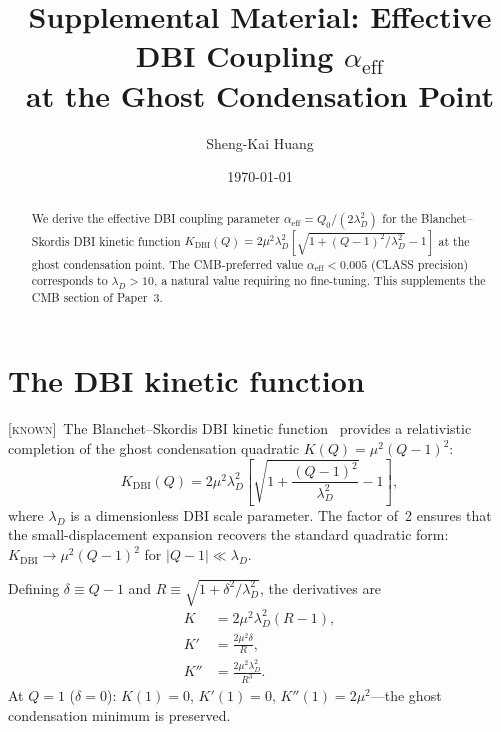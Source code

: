 \documentclass[prd,twocolumn,superscriptaddress,longbibliography,floatfix]{revtex4-2}
\newcommand{\known}{\textsc{[known]}}
\begin{document}
\title{Supplemental Material: Effective DBI Coupling $\alpha_{\mathrm{eff}}$\\
at the Ghost Condensation Point}

\author{Sheng-Kai Huang}

\date{\today}

\begin{abstract}
We derive the effective DBI coupling parameter
$\alpha_{\mathrm{eff}} = Q_0/(2\lambda_D^2)$ for the
Blanchet--Skordis DBI kinetic function
$K_{\mathrm{DBI}}(Q) = 2\mu^2\lambda_D^2
[\sqrt{1 + (Q{-}1)^2/\lambda_D^2} - 1]$
at the ghost condensation point.  The CMB-preferred value
$\alpha_{\mathrm{eff}} < 0.005$ (CLASS precision) corresponds to
$\lambda_D > 10$, a natural value requiring no fine-tuning.
This supplements the CMB section of Paper~3.
\end{abstract}

\maketitle


\section{The DBI kinetic function}
\label{sec:K_DBI}

\known\ The Blanchet--Skordis DBI kinetic
function~\cite{BS2024} provides a relativistic completion
of the ghost condensation quadratic
$K(Q) = \mu^2(Q{-}1)^2$:
\begin{equation}
K_{\mathrm{DBI}}(Q) = 2\mu^2\lambda_D^2
\left[\sqrt{1 + \frac{(Q-1)^2}{\lambda_D^2}} - 1\right],
\label{eq:KDBI}
\end{equation}
where $\lambda_D$ is a dimensionless DBI scale parameter.
The factor of~2 ensures that the small-displacement
expansion recovers the standard quadratic form:
$K_{\mathrm{DBI}} \to \mu^2(Q{-}1)^2$ for
$|Q-1| \ll \lambda_D$.

Defining $\delta \equiv Q - 1$ and
$R \equiv \sqrt{1 + \delta^2/\lambda_D^2}$, the
derivatives are
\begin{align}
K &= 2\mu^2\lambda_D^2(R - 1), \label{eq:K}\\
K' &= \frac{2\mu^2\delta}{R}, \label{eq:Kp}\\
K'' &= \frac{2\mu^2\lambda_D^2}{R^3}. \label{eq:Kpp}
\end{align}
At $Q = 1$ ($\delta = 0$): $K(1) = 0$, $K'(1) = 0$,
$K''(1) = 2\mu^2$---the ghost condensation minimum
is preserved.
\end{document}
